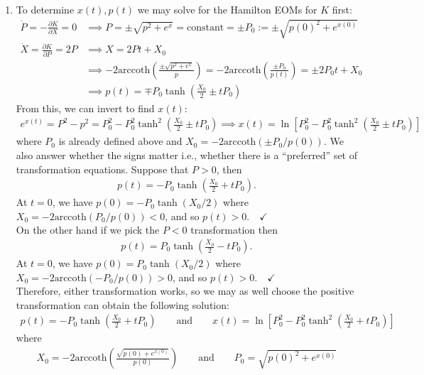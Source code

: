 \documentclass{article}
\theoremstyle{definition}
\newcommand{\p}{\partial}
\newcommand{\f}[2]{\frac{#1}{#2}}
\newcommand{\lp}{\left(}
\newcommand{\rp}{\right)}
\newcommand{\lb}{\left[}
\newcommand{\rb}{\right]}
\begin{document}
\begin{enumerate}[label=(\alph*)]
	
	
	\item To determine $x(t),p(t)$ we may solve for the Hamilton EOMs for $K$ first:
	\begin{align*}
	\dot P = -\f{\p K }{\p X} = 0 &\implies P = \pm \sqrt{p^2 +e^x}  =  \text{constant} = \pm P_0 := \pm \sqrt{p(0)^2 + e^{x(0)} }\\
	\dot X = \f{\p K}{\p P} =  2P &\implies X = 2Pt + X_0\\ 
	&\implies -2\text{arccoth}\lp \f{\pm \sqrt{p^2 +e^x}}{p} \rp = -2\text{arccoth}\lp \f{\pm P_0}{p(t)} \rp   = \pm 2P_0 t + X_0 \\
	&\implies {p(t) = \mp  P_0\tanh\lp \f{X_0}{2} \pm  tP_0 \rp}
	\end{align*}
	From this, we can invert to find $x(t)$:
	\begin{align*}
	e^{x(t)}= P^2 - p^2 = P_0^2 - P_0^2 \tanh^2\lp \f{X_0}{2} \pm t P_0 \rp \implies { x(t) = \ln \lb P_0^2 -  P_0^2\tanh^2\lp \f{X_0}{2} \pm t P_0  \rp \rb}
	\end{align*}
	where $P_0$ is already defined above and $X_0 = -2\text{arccoth}(\pm P_0/p(0))$. We also answer whether the signs matter i.e., whether there is a ``preferred'' set of transformation equations. Suppose that $P > 0$, then 
	\begin{align*}
	p(t) = -P_0 \tanh\lp \f{X_0}{2} + tP_0 \rp.
	\end{align*}
	At $t=0$, we have $p(0) = -P_0 \tanh( X_0/2 )$ where $X_0 = -2\text{arccoth}(P_0/p(0)) < 0$, and so $p(t) > 0.\quad \checkmark$\\
	
	
	On the other hand if we pick the $P<0$ transformation then
	\begin{align*}
	p(t) = P_0 \tanh\lp \f{X_0}{2} - tP_0 \rp.
	\end{align*}
	At $t=0$, we have $p(0) = P_0 \tanh\lp X_0/2 \rp$ where $X_0 = -2\text{arccoth}(-P_0/p(0)) > 0$, and so $p(t) > 0.\quad \checkmark$\\
	
	Therefore, either transformation works, so we may as well choose the positive transformation can obtain the following solution:
	\begin{align*}
	\boxed{p(t) = -P_0\tanh\lp \f{X_0}{2} +  tP_0 \rp \quad\quad\text{and}\quad\quad x(t) = \ln \lb P_0^2 -  P_0^2\tanh^2\lp \f{X_0}{2} + t P_0  \rp \rb}
	\end{align*}
	where
	\begin{align*}
	X_0 = -2\text{arccoth}\lp \f{\sqrt{p(0)+e^{x(0)}}}{p(0)} \rp \quad\quad \text{and}\quad\quad P_0 =\sqrt{p(0)^2 + e^{x(0)}}
	\end{align*}
	

\end{enumerate}
\end{document}
